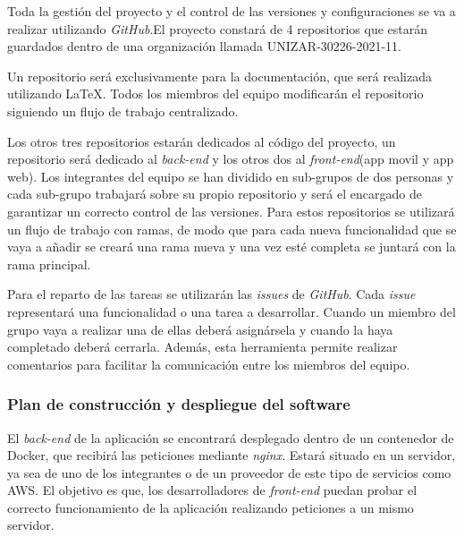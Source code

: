 \documentclass{article}
\begin{document}
Toda la gestión del proyecto y el control de las versiones y configuraciones se va a realizar utilizando \textit{GitHub}.El proyecto constará de 4 repositorios que estarán guardados dentro de una organización llamada UNIZAR-30226-2021-11.

Un repositorio será exclusivamente para la documentación, que será realizada utilizando \LaTeX. Todos los miembros del equipo modificarán el repositorio siguiendo un flujo de trabajo centralizado.

Los otros tres repositorios estarán dedicados al código del proyecto, un repositorio será dedicado al \textit{back-end} y los otros dos al \textit{front-end}(app movil y app web). Los integrantes del equipo se han dividido en sub-grupos de dos personas y cada sub-grupo trabajará sobre su propio repositorio y será el encargado de garantizar un correcto control de las versiones. Para estos repositorios se utilizará un flujo de trabajo con ramas, de modo que para cada nueva funcionalidad que se vaya a añadir se creará una rama nueva y una vez esté completa se juntará con la rama principal.

Para el reparto de las tareas se utilizarán las \textit{issues} de \textit{GitHub}. Cada \textit{issue} representará una funcionalidad o una tarea a desarrollar. Cuando un miembro del grupo vaya a realizar una de ellas deberá asignársela y cuando la haya completado deberá cerrarla. Además, esta herramienta permite realizar comentarios para facilitar la comunicación entre los miembros del equipo.

\subsubsection{Plan de construcción y despliegue del software}


El \textit{back-end} de la aplicación se encontrará desplegado dentro de un contenedor de Docker, que recibirá las peticiones mediante \emph{nginx}. Estará situado en un servidor, ya sea de uno de los integrantes o de un proveedor de este tipo de servicios como AWS. El objetivo es que, los desarrolladores de \textit{front-end} puedan probar el correcto funcionamiento de la aplicación realizando peticiones a un mismo servidor.
\end{document}
